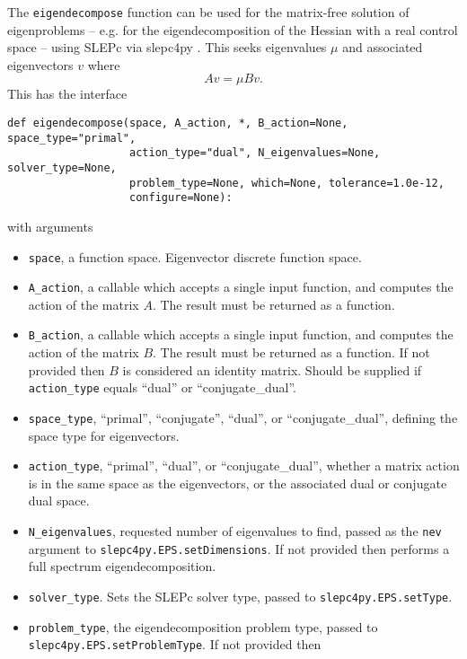 \documentclass[11pt]{article}
\begin{document}
The \texttt{eigendecompose} function can be used for the matrix-free solution
of eigenproblems -- e.g. for the eigendecomposition of the Hessian with a real
control space -- using SLEPc via slepc4py
\citep{hernandez2005,dalcin2011,slepc-user-3.15}. This seeks eigenvalues $\mu$
and associated eigenvectors $v$ where
\begin{equation*}
  A v = \mu B v.
\end{equation*}
This has the interface
\begin{lstlisting}
def eigendecompose(space, A_action, *, B_action=None, space_type="primal",
                   action_type="dual", N_eigenvalues=None, solver_type=None,
                   problem_type=None, which=None, tolerance=1.0e-12,
                   configure=None):
\end{lstlisting}
with arguments
\begin{itemize}
  \item \texttt{space}, a function space. Eigenvector discrete function space.
  \item \texttt{A\_action}, a callable which accepts a single input function,
    and computes the action of the matrix $A$. The result must be returned as a
    function.
  \item \texttt{B\_action}, a callable which accepts a single input function,
    and computes the action of the matrix $B$. The result must be returned as a
    function. If not provided then $B$ is considered an identity matrix. Should
    be supplied if \texttt{action\_type} equals ``dual'' or
    ``conjugate\_dual''.
  \item \texttt{space\_type}, ``primal'', ``conjugate'', ``dual'', or
    ``conjugate\_dual'', defining the space type for eigenvectors.
  \item \texttt{action\_type}, ``primal'', ``dual'', or ``conjugate\_dual'',
    whether a matrix action is in the same space as the eigenvectors, or the
    associated dual or conjugate dual space.
  \item \texttt{N\_eigenvalues}, requested number of eigenvalues to find,
    passed as the \texttt{nev} argument to \texttt{slepc4py.EPS.setDimensions}.
    If not provided then performs a full spectrum eigendecomposition.
  \item \texttt{solver\_type}. Sets the SLEPc solver type, passed to
    \texttt{slepc4py.EPS.setType}.
  \item \texttt{problem\_type}, the eigendecomposition problem type, passed to
    \texttt{slepc4py.EPS.setProblemType}. If not provided then

\end{itemize}
\end{document}
